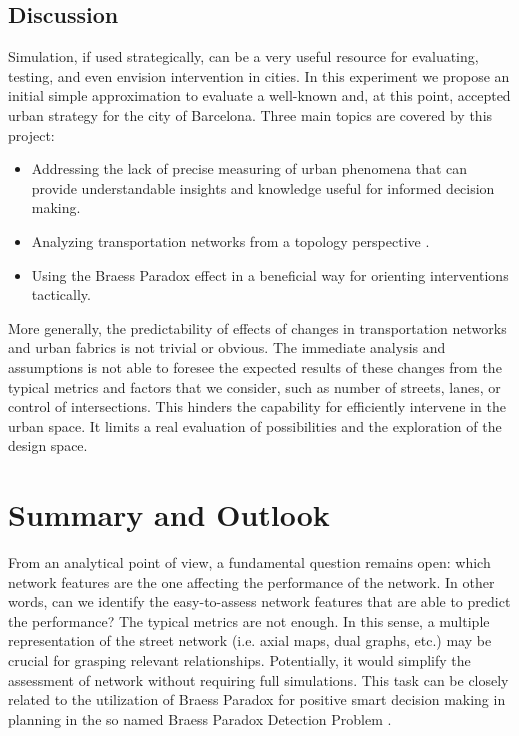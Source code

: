 \documentclass[11pt]{article}
\begin{document}
\subsection{Discussion}
Simulation, if used strategically, can be a very useful resource for evaluating, testing, and even envision intervention in cities. In this experiment we propose an initial simple approximation to evaluate a well-known and, at this point, accepted urban strategy for the city of Barcelona.
Three main topics are covered by this project:
\begin{itemize}
\setlength\itemsep{0.05em}
    \item Addressing the lack of precise measuring of urban phenomena that can provide understandable insights and knowledge useful for informed decision making.
    \item Analyzing transportation networks from a topology perspective \citep{Wang2017}.
    \item Using the Braess Paradox effect in a beneficial way for orienting interventions tactically.
\end{itemize}
More generally, the predictability of effects of changes in transportation networks and urban fabrics is not trivial or obvious. The immediate analysis and assumptions is not able to foresee the expected results of these changes from the typical metrics and factors that we consider, such as number of streets, lanes, or control of intersections. This hinders the capability for efficiently intervene in the urban space. It limits a real evaluation of possibilities and the exploration of the design space.

\section{Summary and Outlook}

From an analytical point of view, a fundamental question remains open: which network features are the one affecting the performance of the network. In other words, can we identify the easy-to-assess network features that are able to predict the performance? The typical metrics are not enough. In this sense, a multiple representation of the street network (i.e. axial maps, dual graphs, etc.) may be crucial for grasping relevant relationships. Potentially, it would simplify the assessment of network without requiring full simulations. This task can be closely related to the utilization of Braess Paradox for positive smart decision making in planning in the so named Braess Paradox Detection Problem \citep{Bagloee2019}.
\end{document}
